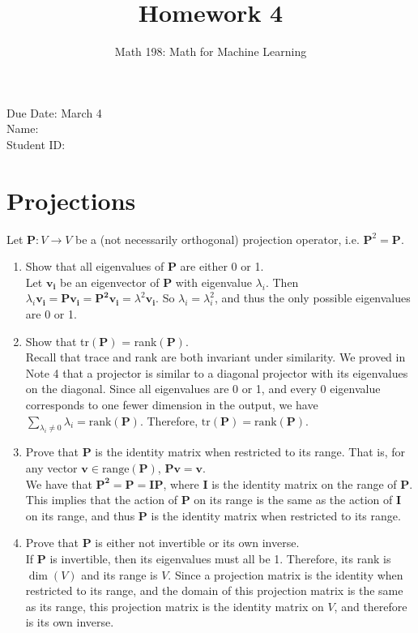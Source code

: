 \documentclass{article}
\title{Homework 4}
\author{Math 198: Math for Machine Learning}
\date{}
\begin{document}
\maketitle

\noindent
Due Date: March 4 \\
Name: \\
Student ID:

\section{Projections}
Let $\mathbf{P}: V \to V$ be a (not necessarily orthogonal) projection operator, i.e. $\mathbf{P}^2 = \mathbf{P}$. 
\begin{enumerate}
\item Show that all eigenvalues of $\mathbf{P}$ are either 0 or 1. \\
{\color{blue} Let $\mathbf{v_i}$ be an eigenvector of $\mathbf{P}$ with eigenvalue $\lambda_i$. Then $\lambda_i\mathbf{v_i} = \mathbf{Pv_i} = \mathbf{P^2v_i} = \lambda^2\mathbf{v_i}$. So $\lambda_i = \lambda_i^2$, and thus the only possible eigenvalues are 0 or 1.}
\item Show that tr$(\mathbf{P})$ = rank$(\mathbf{P})$. \\
{\color{blue} Recall that trace and rank are both invariant under similarity. We proved in Note 4 that a projector is similar to a diagonal projector with its eigenvalues on the diagonal. Since all eigenvalues are 0 or 1, and every 0 eigenvalue corresponds to one fewer dimension in the output, we have $
\sum_{\lambda_i \neq 0} \lambda_i = \text{rank}(\mathbf{P})$. Therefore, $\text{tr}(\mathbf{P}) = \text{rank}(\mathbf{P})$.}
\item Prove that $\mathbf{P}$ is the identity matrix when restricted to its range. That is, for any vector $\mathbf{v} \in \text{range}(\mathbf{P})$, $\mathbf{Pv} = \mathbf{v}$. \\
{\color{blue} We have that $\mathbf{P^2} = \mathbf{P} = \mathbf{IP}$, where $\mathbf{I}$ is the identity matrix on the range of $\mathbf{P}$. This implies that the action of $\mathbf{P}$ on its range is the same as the action of $\mathbf{I}$ on its range, and thus $\mathbf{P}$ is the identity matrix when restricted to its range.}
\item Prove that $\mathbf{P}$ is either not invertible or its own inverse. \\
{\color{blue} If $\mathbf{P}$ is invertible, then its eigenvalues must all be 1. Therefore, its rank is $\dim(V)$ and its range is $V$. Since a projection matrix is the identity when restricted to its range, and the domain of this projection matrix is the same as its range, this projection matrix is the identity matrix on $V$, and therefore is its own inverse. }
\end{enumerate}
\end{document}
